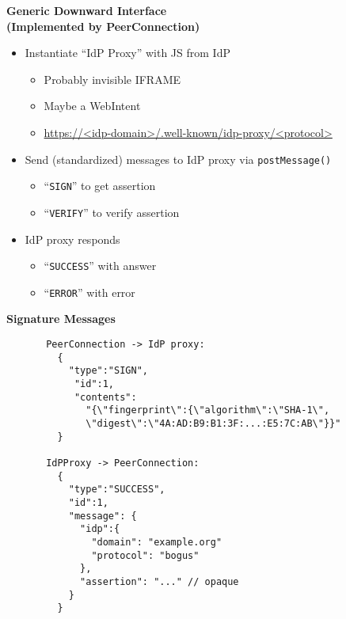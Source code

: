 \documentclass[helvetica]{seminar}
\newcommand{\heading}[1]{%
  \begin{center} 
    \large\bf 
    #1 
  \end{center} 
  \vspace{.4 in}}
\begin{document}
\begin{slide}
\heading{Generic Downward Interface\\(Implemented by PeerConnection)}

\begin{itemize}
\item Instantiate ``IdP Proxy'' with JS from IdP
  \begin{itemize}
  \item Probably invisible IFRAME
  \item Maybe a WebIntent
  \item[] {\small \url{https://<idp-domain>/.well-known/idp-proxy/<protocol>}}
  \end{itemize}

\item Send (standardized) messages to IdP proxy via \verb^postMessage()^
  \begin{itemize}
  \item ``\verb^SIGN^'' to get assertion
  \item ``\verb^VERIFY^'' to verify assertion
  \end{itemize}

\item IdP proxy responds 
  \begin{itemize}
  \item ``\verb^SUCCESS^'' with answer
  \item ``\verb^ERROR^'' with error
  \end{itemize}
\end{itemize}
\end{slide}


\begin{slide}
\heading{Signature Messages}

\begin{tiny}
\begin{verbatim}
       PeerConnection -> IdP proxy:
         {
           "type":"SIGN",
            "id":1,
            "contents":
              "{\"fingerprint\":{\"algorithm\":\"SHA-1\",
              \"digest\":\"4A:AD:B9:B1:3F:...:E5:7C:AB\"}}"
         }

       IdPProxy -> PeerConnection:
         {
           "type":"SUCCESS",
           "id":1,
           "message": {
             "idp":{
               "domain": "example.org"
               "protocol": "bogus"
             },
             "assertion": "..." // opaque
           }
         }
\end{verbatim}
\end{tiny}
\end{slide}
\end{document}

